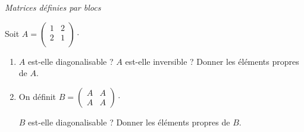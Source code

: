 \documentclass[a4paper,10pt]{report}
\begin{document}
\begin{center}
\textit{{ {\large Matrices définies par blocs}}}
\end{center}

\medskip

\begin{Exercice}{} Soit $A= \begin{pmatrix}
1& 2 \\
2 & 1 \\
\end{pmatrix}\cdot$
\begin{enumerate}
\item $A$ est-elle diagonalisable ? $A$ est-elle inversible ? Donner les éléments propres de $A$.
\item  On définit $B = \begin{pmatrix}
A & A \\
A & A 
\end{pmatrix}\cdot$

$B$ est-elle diagonalisable ? Donner les éléments propres de $B$.
\end{enumerate}
\end{Exercice}
\end{document}
